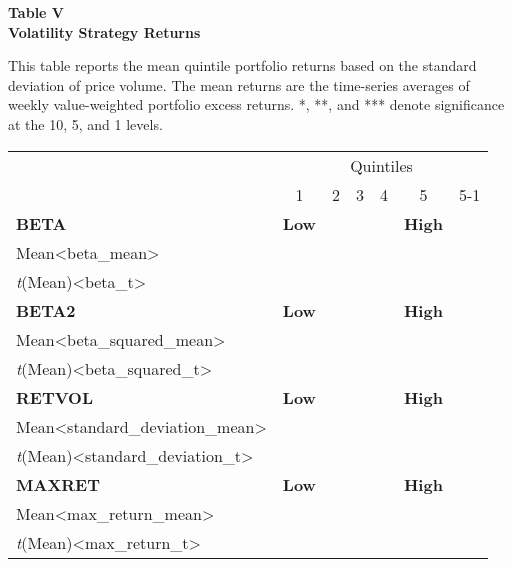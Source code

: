 \documentclass{article}
\begin{document}
    \begin{center}
        \textbf{
        Table V
        \\
        Volatility Strategy Returns
        }
        \begin{justify}
            \footnotesize{
                This table reports the mean quintile portfolio returns based on the standard deviation of price volume. The mean returns are the time-series averages of weekly value-weighted portfolio excess returns. *, **, and *** denote significance at the 10, 5, and 1 levels.
            }
        \end{justify}
        \-
        \begin{tabular}{lcccccr}
            \toprule
            \multicolumn{1}{c}{} & \multicolumn{6}{c}{Quintiles}
            \\
            \cmidrule(lr){2-7}
            & 1 & 2 & 3 & 4 & 5 & 5-1
            \\
            \midrule
            \multicolumn{1}{l}{\textbf{BETA}} & \multicolumn{1}{c}{\textbf{Low}} & \multicolumn{3}{c}{} & \multicolumn{1}{c}{\textbf{High}}
            \\
            Mean<beta_mean>
            \\
            \textit{t}(Mean)<beta_t>
            \\ [0.2cm]
            \multicolumn{1}{l}{\textbf{BETA2}} & \multicolumn{1}{c}{\textbf{Low}} & \multicolumn{3}{c}{} & \multicolumn{1}{c}{\textbf{High}}
            \\
            Mean<beta_squared_mean>
            \\
            \textit{t}(Mean)<beta_squared_t>
            \\ [0.2cm]
            \multicolumn{1}{l}{\textbf{RETVOL}} & \multicolumn{1}{c}{\textbf{Low}} & \multicolumn{3}{c}{} & \multicolumn{1}{c}{\textbf{High}}
            \\
            Mean<standard_deviation_mean>
            \\
            \textit{t}(Mean)<standard_deviation_t>
            \\ [0.2cm]
            \multicolumn{1}{l}{\textbf{MAXRET}} & \multicolumn{1}{c}{\textbf{Low}} & \multicolumn{3}{c}{} & \multicolumn{1}{c}{\textbf{High}}
            \\
            Mean<max_return_mean>
            \\
            \textit{t}(Mean)<max_return_t>
            \\ [0.2cm]

\end{tabular}
\end{center}
\end{document}
